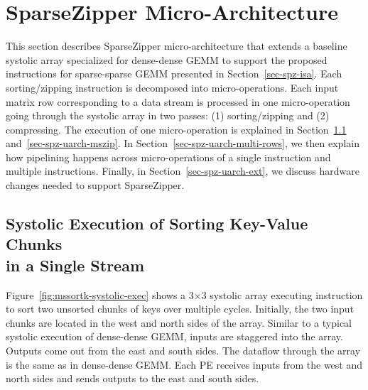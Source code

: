 
\section{S\lowercase{parse}Z\lowercase{ipper} Micro-Architecture}
\label{sec-spz-uarch}

This section describes SparseZipper micro-architecture that extends a baseline
systolic array specialized for dense-dense GEMM to support the proposed
instructions for sparse-sparse GEMM presented in Section~\ref{sec-spz-isa}.
Each sorting/zipping instruction is decomposed into micro-operations.
Each input matrix row corresponding to a data stream is processed in one
micro-operation going through the systolic array in two passes: (1)
sorting/zipping and (2) compressing.  The execution of one micro-operation is
explained in Section~\ref{sec-spz-uarch-mssort} and~\ref{sec-spz-uarch-mszip}.
In Section~\ref{sec-spz-uarch-multi-rows}, we then explain how pipelining
happens across micro-operations of a single instruction and multiple
instructions.
Finally, in Section~\ref{sec-spz-uarch-ext}, we discuss hardware changes needed
to support SparseZipper.





%
%

\subsection{Systolic Execution of Sorting Key-Value Chunks \\ in a Single Stream}
\label{sec-spz-uarch-mssort}

Figure~\ref{fig:mssortk-systolic-exec} shows a 3$\times$3 systolic array
executing  instruction to sort two unsorted chunks of keys over
multiple cycles.
Initially, the two input chunks are located in the west and north sides of the
array.
Similar to a typical systolic execution of dense-dense GEMM, inputs are
staggered into the array.
Outputs come out from the east and south sides.
The dataflow through the array is the same as in dense-dense GEMM.
Each PE receives inputs from the west and north sides and sends outputs to the
east and south sides.

